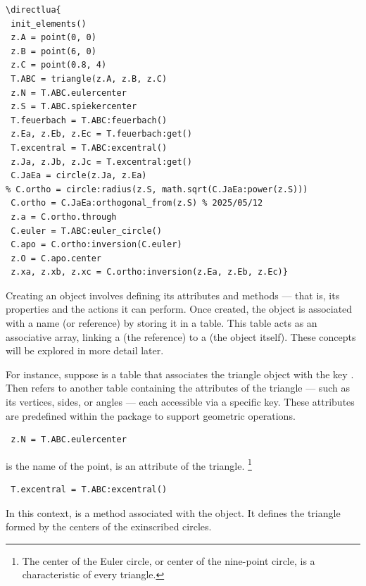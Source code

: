 \begin{mybox}
\begin{verbatim}
\directlua{
 init_elements()
 z.A = point(0, 0)
 z.B = point(6, 0)
 z.C = point(0.8, 4)
 T.ABC = triangle(z.A, z.B, z.C)
 z.N = T.ABC.eulercenter
 z.S = T.ABC.spiekercenter
 T.feuerbach = T.ABC:feuerbach()
 z.Ea, z.Eb, z.Ec = T.feuerbach:get()
 T.excentral = T.ABC:excentral()
 z.Ja, z.Jb, z.Jc = T.excentral:get()
 C.JaEa = circle(z.Ja, z.Ea)
% C.ortho = circle:radius(z.S, math.sqrt(C.JaEa:power(z.S)))
 C.ortho = C.JaEa:orthogonal_from(z.S) % 2025/05/12
 z.a = C.ortho.through
 C.euler = T.ABC:euler_circle()
 C.apo = C.ortho:inversion(C.euler)
 z.O = C.apo.center
 z.xa, z.xb, z.xc = C.ortho:inversion(z.Ea, z.Eb, z.Ec)}
\end{verbatim}
\end{mybox}

Creating an object involves defining its attributes and methods — that is, its properties and the actions it can perform. Once created, the object is associated with a name (or reference) by storing it in a table. This table acts as an associative array, linking a  (the reference) to a  (the object itself). These concepts will be explored in more detail later.

For instance, suppose  is a table that associates the triangle object with the key . Then  refers to another table containing the attributes of the triangle — such as its vertices, sides, or angles — each accessible via a specific key. These attributes are predefined within the package to support geometric operations.

\vspace{1em}
\begin{mybox}
\begin{verbatim}
 z.N = T.ABC.eulercenter
\end{verbatim}
\end{mybox}

 is the name of the point,  is an attribute of the triangle.
\footnote{ The center of the Euler circle, or center of the nine-point circle, is a characteristic of every triangle.}

\begin{mybox}
\begin{verbatim}
 T.excentral = T.ABC:excentral()
\end{verbatim}
\end{mybox}

In this context,  is a method associated with the object. It defines the triangle formed by the centers of the exinscribed circles.


